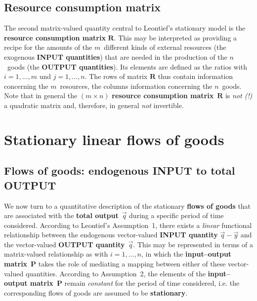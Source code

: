 \subsection{Resource consumption matrix}
The second matrix-valued quantity central to Leontief's stationary 
model is the {\bf resource consumption matrix} $\mathbf{R}$. This 
may be interpreted as providing a recipe for the amounts of the 
$m$~different kinds of external resources (the exogenous {\bf 
INPUT quantities}) that are needed in the production of the 
$n$~goods (the {\bf OUTPUT quantities}). Its elements are defined 
as the ratios
%
\be
{}
\ee
%
with $i=1,\ldots,m$ und $j=1,\ldots,n$. The rows of matrix 
$\mathbf{R}$ thus contain information concerning the 
$m$~resources, the columns information concerning the $n$~goods. 
Note that in general the $(m \times n)$ {\bf resource consumption 
matrix}~$\mathbf{R}$ is \emph{not (!)} a quadratic matrix and, 
therefore, in general \emph{not} invertible.

\section[Stationary linear flows of goods]%
{Stationary linear flows of goods}
\subsection{Flows of goods: endogenous INPUT to total OUTPUT}
We now turn to a quantitative description of the stationary {\bf 
flows of goods} that are associated with the {\bf total 
output}~$\vec{q}$ during a specific period of time considered. 
According to Leontief's Assumption~1, there exists a \emph{linear} 
functional relationship between the endogenous vector-valued {\bf 
INPUT quantity} $\vec{q}-\vec{y}$ and the vector-valued {\bf 
OUTPUT quantity}~$\vec{q}$. This may be represented in terms of a 
matrix-valued relationship as
%
\be
{}
\ee
%
with $i = 1, \ldots, n$, in which the {\bf input--output 
matrix}~$\mathbf{P}$ takes the role of mediating a mapping between 
either of these vector-valued quantities. According to 
Assumption~2, the elements of the {\bf input--output 
matrix}~$\mathbf{P}$ remain \emph{constant} for the period of time 
considered, i.e. the corresponding flows of goods are assumed to 
be {\bf stationary}.

